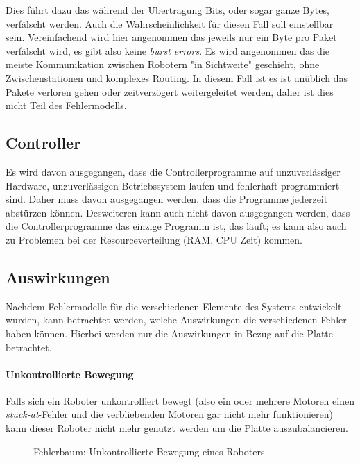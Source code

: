 Dies f{\"{u}}hrt dazu das w{\"{a}}hrend der {\"{U}}bertragung Bits, oder sogar ganze Bytes, verf{\"{a}}lscht werden. Auch die Wahrscheinlichkeit f{\"{u}}r diesen Fall
soll einstellbar sein. Vereinfachend wird hier angenommen das jeweils nur ein Byte pro Paket verf{\"{a}}lscht wird, es gibt also keine \textit{burst errors}.
Es wird angenommen das die meiste Kommunikation zwischen Robotern "in Sichtweite" geschieht, ohne Zwischenstationen und komplexes Routing. In diesem Fall ist
es ist un{\"{u}}blich das Pakete verloren gehen oder zeitverz{\"{o}}gert weitergeleitet werden, daher ist dies nicht Teil des Fehlermodells.

\subsection{Controller}
Es wird davon ausgegangen, dass die Controllerprogramme auf unzuverl{\"{a}}ssiger Hardware, unzuverl{\"{a}}ssigen 
Betriebssystem laufen und fehlerhaft programmiert sind. Daher muss davon ausgegangen werden, dass die
Programme jederzeit abst{\"{u}}rzen k{\"{o}}nnen. Desweiteren kann auch nicht davon ausgegangen werden,
dass die Controllerprogramme das einzige Programm ist, das l{\"{a}}uft; es kann also auch zu Problemen bei
der Resourceverteilung (RAM, CPU Zeit) kommen.

\subsection{Auswirkungen}
Nachdem Fehlermodelle f{\"{u}}r die verschiedenen Elemente des Systems entwickelt wurden, kann
betrachtet werden, welche Auswirkungen die verschiedenen Fehler haben k{\"{o}}nnen. Hierbei werden nur
die Auswirkungen in Bezug auf die Platte betrachtet.

\paragraph{Unkontrollierte Bewegung} Falls sich ein Roboter unkontrolliert bewegt (also ein oder
mehrere Motoren einen \textit{stuck-at}-Fehler und die verbliebenden Motoren gar nicht mehr funktionieren)
kann dieser Roboter nicht mehr genutzt werden um die Platte auszubalancieren.
\begin{figure}
	\centering
	\caption{Fehlerbaum: Unkontrollierte Bewegung eines Roboters}
	\label{fig:fault-tree-robot}
\end{figure}
\clearpage

